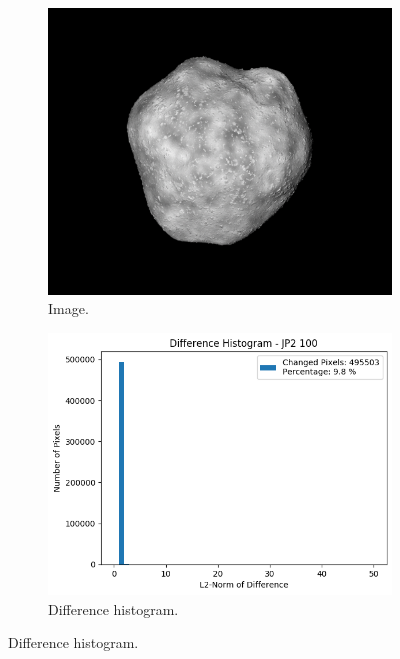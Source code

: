 \begin{figure}[htb]
    \centering
    \begin{subfigure}[b]{0.48\textwidth}
        \centering
        \includegraphics[width=\textwidth]{doc/thesis/0_figures/compare_quality/set1/jp2_100.png}
        \caption{Image.}
        \label{fig:img_quality_comp_jp2_100_orig}
    \end{subfigure}
    \begin{subfigure}[b]{0.48\textwidth}
        \centering
        \includegraphics[width=\textwidth]{doc/thesis/0_figures/compare_quality/set1/jp2_100_diff_histogram.png}
        \caption{Difference histogram.}

\end{subfigure}
\end{figure}
